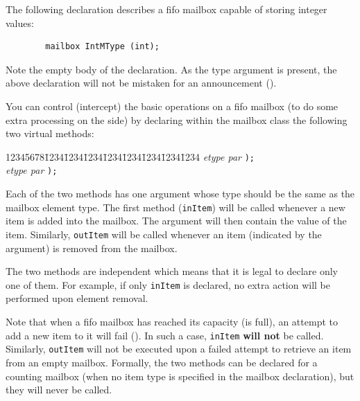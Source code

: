 \noindent
The following declaration describes a fifo mailbox capable of storing integer
values:
\begin{verbatim}
        mailbox IntMType (int);
\end{verbatim}
Note the empty body of the declaration.
As the type argument is present, the above declaration will not be
mistaken for an announcement ().

\medskip

\noindent
You can control (intercept) the basic operations on a fifo mailbox (to
do some extra processing on the side) by declaring
within the mailbox class the following two virtual methods:
{\tt\begin{tabbing}
12345678\=1234\=1234\=1234\=1234\=1234\=1234\=1234\=1234\kill
{} {\em etype par\/} {\tt );} \\
 {\em etype par\/} {\tt );}
\end{tabbing}}

Each of the two methods has one argument whose type should be the same as
the mailbox element type.
The first method ({\tt inItem}) will be called whenever a new item is
added into the mailbox.
The argument will then contain the value of the item.
Similarly, {\tt outItem} will be called whenever an item (indicated by the
argument) is removed from the mailbox.

The two methods are independent which means that it is legal to declare
only one of them.
For example, if only {\tt inItem} is declared, no extra
action will be performed upon element removal.

Note that when a fifo mailbox has reached its capacity (is full),
an attempt to add a new item to it will fail ().
In such a case, {\tt inItem} {\bf will not} be called.
Similarly, {\tt outItem} will not be executed upon a failed attempt to
retrieve an item from an empty mailbox.
Formally, the two methods can be declared for a counting mailbox (when no
item type is specified in the mailbox declaration), but they will
never be called.

